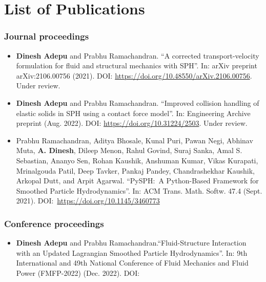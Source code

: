 \chapter{List of Publications}%
\label{chap:lop}

\subsection*{Journal proceedings}

\begin{itemize}
\item \textbf{Dinesh Adepu} and Prabhu Ramachandran. ``A corrected
  transport-velocity formulation for fluid and structural mechanics with
  SPH''. In: arXiv preprint arXiv:2106.00756
  (2021). DOI: \url{https://doi.org/10.48550/arXiv.2106.00756}. Under review.


\item \textbf{Dinesh Adepu} and Prabhu Ramachandran. ``Improved collision
  handling of elastic solids in SPH using a contact force model''. In:
  Engineering Archive preprint
  (Aug. 2022). DOI: \url{https://doi.org/10.31224/2503}. Under review.

\item Prabhu Ramachandran, Aditya Bhosale, Kunal Puri, Pawan Negi, Abhinav Muta,
  \textbf{A. Dinesh}, Dileep Menon, Rahul Govind, Suraj Sanka, Amal S. Sebastian, Ananyo
  Sen, Rohan Kaushik, Anshuman Kumar, Vikas Kurapati, Mrinalgouda Patil, Deep
  Tavker, Pankaj Pandey, Chandrashekhar Kaushik, Arkopal Dutt, and Arpit
  Agarwal. ``PySPH:~A Python-Based Framework for Smoothed Particle
  Hydrodynamics''. In: ACM Trans. Math. Softw. 47.4
  (Sept. 2021). DOI:~\url{https://doi.org/10.1145/3460773}
\end{itemize}


\subsection*{Conference proceedings}
\label{sec:conf-proc}
\begin{itemize}
\item \textbf{Dinesh Adepu} and Prabhu Ramachandran.``Fluid-Structure
  Interaction with an Updated Lagrangian Smoothed Particle Hydrodynamics''. In:
  9th International and 49th National Conference of Fluid Mechanics and Fluid
  Power (FMFP-2022) (Dec. 2022). DOI:
\end{itemize}